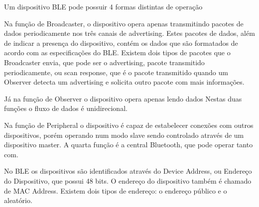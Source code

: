Um dispositivo BLE pode possuir 4 formas distintas de operação

    
    

Na função de Broadcaster, o dispositivo opera apenas transmitindo pacotes de dados periodicamente nos três canais de advertising. 
Estes pacotes de dados, além de indicar a presença do dispositivo, contém os dados que são formatados de acordo com as especificações do BLE. 
Existem dois tipos de pacotes que o Broadcaster envia, que pode ser o advertising, pacote transmitido periodicamente, ou scan response,
que é o pacote transmitido quando um Observer detecta um advertising e solicita outro pacote com mais informações.

Já na função de Observer o dispositivo opera apenas lendo dados Nestas duas
funções o fluxo de dados é unidirecional.
    
Na função de Peripheral o dispositivo é capaz de estabelecer conexões com
outros dispositivos, porém operando num modo slave sendo controlado através de
um dispositivo master. A quarta função é a central Bluetooth, que pode operar tanto com.


No BLE os dispositivos são identificados através do Device Address, ou Endereço
do Dispositivo, que possui 48 bits. O endereço do dispositivo também é chamado
de MAC Address. Existem dois tipos de endereço: o endereço público e o
aleatório.













